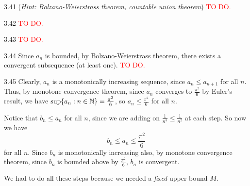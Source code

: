 3.41 (\textit{Hint: Bolzano-Weierstrass theorem, countable union theorem}) \textcolor{red}{TO DO.}

3.42 \textcolor{red}{TO DO.}

3.43 \textcolor{red}{TO DO.}

3.44 Since $a_n$ is bounded, by Bolzano-Weierstrass theorem, there exists a convergent subsequence (at least one). \textcolor{red}{TO DO.}

3.45 Clearly, $a_n$ is a monotonically increasing sequence, since $a_{n}\leq a_{n+1}$ for all $n$. Thus, by monotone convergence theorem,
since $a_n$ converges to $\frac{\pi^2}{6}$ by Euler's result, we have $\sup\{a_n:n\in\mathbb{N}\}=\frac{\pi^2}{6}$, so $a_n\leq \frac{\pi^2}{6}$ for all $n$.

Notice that $b_n \leq a_n$ for all $n$, since we are adding on $\frac{1}{n^3} \leq \frac{1}{n^2}$ at each step. So now we have
\[b_n \leq a_n \leq \frac{\pi^2}{6}\]
for all $n$. Since $b_n$ is monotonically increasing also, by monotone convergence theorem, since $b_n$ is bounded above by $\frac{\pi^2}{6}$, $b_n$ is convergent.

\begin{remark}
    We had to do all these steps because we needed a \emph{fixed} upper bound $M$.
\end{remark}
